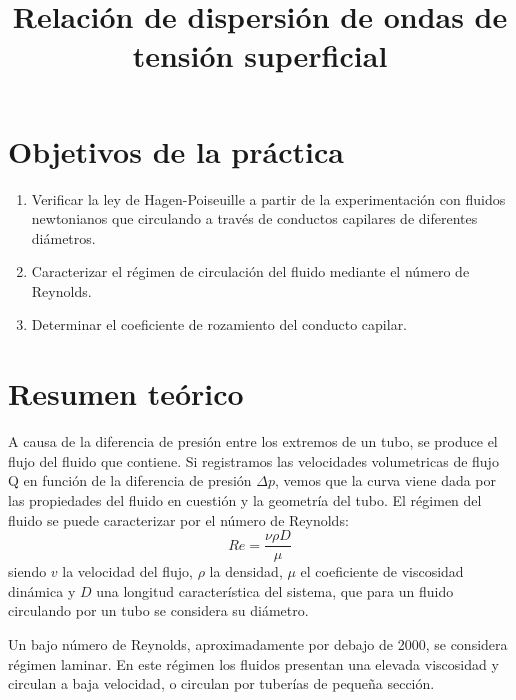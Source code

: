 \documentclass[a4paper,12pt,spanish]{article}
\begin{document}
	
	
	\title{ Relación de dispersión de ondas de tensión superficial}
	
	\date{}
	
	\maketitle
	
	
	\section{Objetivos de la práctica}
	
	\begin{enumerate}
		\item Verificar la ley de Hagen-Poiseuille a partir de la experimentación con fluidos newtonianos que circulando a través de conductos capilares de diferentes diámetros.
		\item Caracterizar el régimen de circulación del fluido mediante el número de Reynolds.
		\item Determinar el coeficiente de rozamiento del conducto capilar.
	\end{enumerate}
	
	
	
	\section{Resumen teórico}
	
	A causa de la diferencia de presión entre los extremos de un tubo, se produce el flujo del fluido que contiene. Si registramos las velocidades volumetricas de flujo Q en función de la diferencia de presión $\mathit{\Delta }p$, vemos que la curva viene dada por las propiedades del fluido en cuestión y la geometría del tubo. El régimen del fluido se puede caracterizar por el número de Reynolds:
	\[ Re = \frac{\nu\rho D}{\mu}
	\]
	siendo $v$ la velocidad del flujo, $\rho$ la densidad, $\mu $ el coeficiente de viscosidad dinámica y $D$ una longitud característica del sistema, que para un fluido circulando por un tubo se considera su diámetro. 
	
	Un bajo número de Reynolds, aproximadamente por debajo de 2000, se considera régimen laminar. En este régimen los fluidos presentan una elevada viscosidad y circulan a baja velocidad, o circulan por tuberías de pequeña sección. 
	
\end{document}
